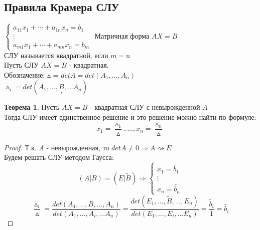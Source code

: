 \documentclass[a4paper, 12pt]{article}
\theoremstyle{definition}
\newtheorem*{theorem}{Теорема}
\begin{document}
  \subsection{Правила Крамера СЛУ}
  $\begin{cases}
    a_{11}x_1 + \cdots + a_{1n}x_n = b_1 \\
    \vdots \\ 
    a_{m1}x_1 + \cdots + a_{mn}x_n = b_m 
  \end{cases}$
  Матричная форма $AX=B$ \vspace{0.5cm}\\ 
  СЛУ называется квадратной, если $m=n$ \\
  Пусть СЛУ $AX=B$  - квадратная. \\
  Обозначение: $\vartriangle$ = $detA = det(A_1,...,A_n)$\\
  $\vartriangle_i = det(A_1,...,\underset{i}{B} ,...A_n)$
  \begin{theorem}
    Пусть $AX = B$ - квадратная СЛУ с невырожденной $A$ \\
    Тогда СЛУ имеет единственное решение и это решение можно найти по формуле:
    $$x_1 = \frac{\vartriangle_1}{\vartriangle },...,x_n = \frac{\vartriangle_n}{\vartriangle }$$  
  \end{theorem} 
  \begin{proof}
    Т.к. $A$ - невырожденная, то $detA \not = 0 \Longrightarrow A\rightsquigarrow E$\\
    Будем решать СЛУ методом Гаусса:
    $$(A|B) = (E|\widetilde{B}
    ) \Longrightarrow \begin{cases}
      x_1 = \widetilde{b_1}\\
      \vdots \\
      x_n = \widetilde{b_n}
    \end{cases}$$
    $$\frac{\vartriangle_i}{\vartriangle } = \frac{det(A_1,...,B,...,A_n)}{det(A_1,...,A_i,...A_n)} = \frac{det(E_1,...,\widetilde{B},...,E_n)}{det(E_1,...,E_i,...E_n)} = \frac{\widetilde{b_i}}{1} = \widetilde{b_i}$$  
  \end{proof} 
\end{document}

